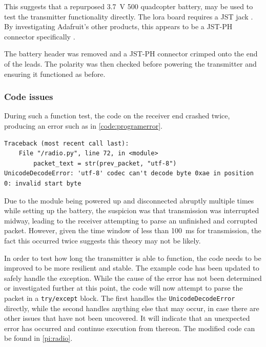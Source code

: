 This suggests that a repurposed \qty{3.7}{\V}
\qty{500}{\mAh} quadcopter battery, may be used to test the transmitter functionality directly.
The \gls{lora} board requires a JST jack \cite{adafruit:loram0}. By investigating Adafruit's
other products, this appears to be a JST-PH connector specifically \cite{adafruit:jst}.

The battery header was removed and a JST-PH connector crimped onto the end of the leads.
The polarity was then checked before powering the transmitter and ensuring it functioned
as before.

\subsubsection{Code issues}
\label{sec:codeissues}
During such a function test, the code on the receiver end crashed twice, producing an error such
as in \cref{code:programerror}.

\begin{lstlisting}[caption={Program error message},label=code:programerror,captionpos=b]
Traceback (most recent call last):
    File "/radio.py", line 72, in <module>
        packet_text = str(prev_packet, "utf-8")
UnicodeDecodeError: 'utf-8' codec can't decode byte 0xae in position 0: invalid start byte
\end{lstlisting}

Due to the module being powered up and disconnected abruptly multiple times
while setting up the battery, the suspicion was that transmission was interrupted midway,
leading to the receiver attempting to parse an unfinished and corrupted packet. However,
given the time window of less than \qty{100}{\ms} for transmission, the fact this occurred
twice suggests this theory may not be likely.

In order to test how long the transmitter is able to function, the code needs to be
improved to be more resilient and stable. The example code \cite{adafruit:radiopy} has
been updated to safely handle the exception. While the cause of the error has not been
determined or investigated further at this point, the code will now attempt to parse
the packet in a \lstinline{try/except} block. The first handles the
\lstinline{UnicodeDecodeError} directly, while the second handles anything else that
may occur, in case there are other issues that have not been uncovered. It will indicate
that an unexpected error has occurred and continue execution from thereon.
The modified code can be found in \cref{pi:radio}.

